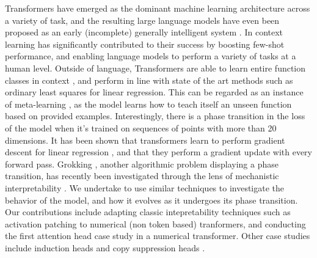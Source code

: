 \documentclass{article}
\begin{document}
Transformers \citep{vaswani_2017_attention} have emerged as the dominant machine learning architecture across a variety of task, and the resulting large language models have even been proposed as an early (incomplete) generally intelligent system \citep{bubeck_2023_sparks}.
In context learning \citep{brown_2020_language} has significantly contributed to their success by boosting few-shot performance, and enabling language models to perform a variety of tasks at a human level. Outside of language, Transformers are able to learn entire function classes in context \citep{garg_2023_what}, and perform in line with state of the art methods such as ordinary least squares for linear regression. This can be regarded as an instance of meta-learning \citep{thrun_1998_learning}, as the model learns how to teach itself an unseen function based on provided examples. Interestingly, there is a phase transition in the loss of the model when it’s trained on sequences of points with more than 20 dimensions. It has been shown that transformers learn to perform gradient descent for linear regression \citep{vonoswald_2023_transformers}, and that they perform a gradient update with every forward pass. Grokking \citep{power_2022_grokking}, another algorithmic problem displaying a phase transition, has recently been investigated through the lens of mechanistic interpretability \citep{nanda_2023_progress}. We undertake to use similar techniques to investigate the behavior of the model, and how it evolves as it undergoes its phase transition. Our contributions include adapting classic intepretability techniques such as activation patching \citep{zhang_2023_towards} to numerical (non token based) tranformers, and conducting the first attention head case study in a numerical transformer. Other case studies include induction heads \citep{olsson_2022_incontext} and copy suppression heads \citep{mcdougall_2023_copy}.
\end{document}
